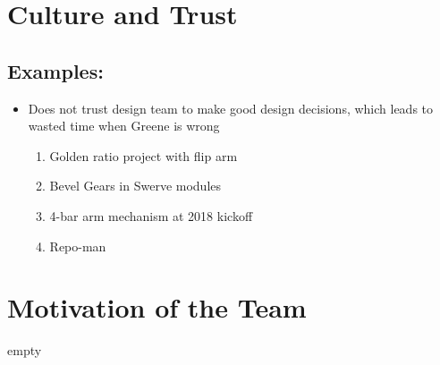 \documentclass[12pt]{article}
\theoremstyle{break}
\numberwithin{theorem}{subsection}
\numberwithin{lemma}{subsection}
\numberwithin{corollary}{subsection}
\numberwithin{equation}{subsection}
\begin{document}
\section{Culture and Trust}
\subsection{Examples: }
\begin{itemize}
	\item Does not trust design team to make good design decisions, which leads to wasted time when
		Greene is wrong
	\begin{enumerate}
		\item Golden ratio project with flip arm
		\item Bevel Gears in Swerve modules
		\item 4-bar arm mechanism at 2018 kickoff 
		\item Repo-man
	\end{enumerate}
\end{itemize}

\section{Motivation of the Team}
empty
\end{document}
